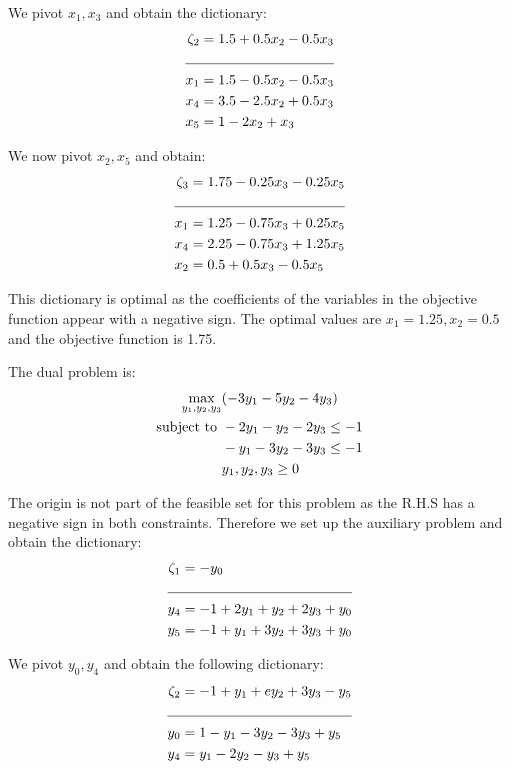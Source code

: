 \documentclass[letterpaper,12pt]{article}
\theoremstyle{definition}
\begin{document}
We pivot $x_1, x_3$ and obtain the dictionary:
\begin{align*}
  \zeta_2 &= 1.5 + 0.5x_2-0.5x_3\\
  \cline{1-2}
  x_1 &= 1.5 -0.5x_2-0.5x_3\\
  x_4 &= 3.5-2.5x_2+0.5x_3\\
  x_5 &= 1-2x_2+x_3\\
\end{align*}

We now pivot $x_2,x_5$ and obtain:
\begin{align*}
  \zeta_3 &= 1.75 - 0.25x_3-0.25x_5\\
  \cline{1-2}
  x_1 &= 1.25 - 0.75x_3+0.25x_5\\
  x_4 &= 2.25 - 0.75x_3+1.25x_5\\
  x_2 &= 0.5+0.5x_3-0.5x_5\\
\end{align*}

This dictionary is optimal as the coefficients of the variables in the objective function appear with a
negative sign. The optimal values are $x_1=1.25, x_2 = 0.5$ and the objective function is 1.75.

The dual problem is:
\begin{align*}
  \max_{y_1, y_2, y_3}&(-3y_1-5y_2-4y_3)\\
  \textnormal{subject to } &-2y_1-y_2-2y_3 \le -1\\
  &-y_1-3y_2-3y_3 \le -1\\
  &y_1, y_2, y_3 \ge 0
\end{align*}


The origin is not part of the feasible set for this problem as the R.H.S has a negative sign in both constraints.
Therefore we set up the auxiliary problem and obtain the dictionary:
\begin{align*}
  \zeta_1 &= -y_0\\
  \cline{1-2}
  y_4 &= -1 +2y_1+y_2+2y_3+y_0\\
  y_5 &= -1 + y_1 +3y_2+3y_3+y_0\\
\end{align*}

We pivot $y_0, y_4$ and obtain the following dictionary:
\begin{align*}
  \zeta_2 &= -1+y_1+ey_2+3y_3-y_5\\
  \cline{1-2}
  y_0 &= 1-y_1-3y_2-3y_3+y_5\\
  y_4 &= y_1-2y_2-y_3+y_5\\
\end{align*}
\end{document}
